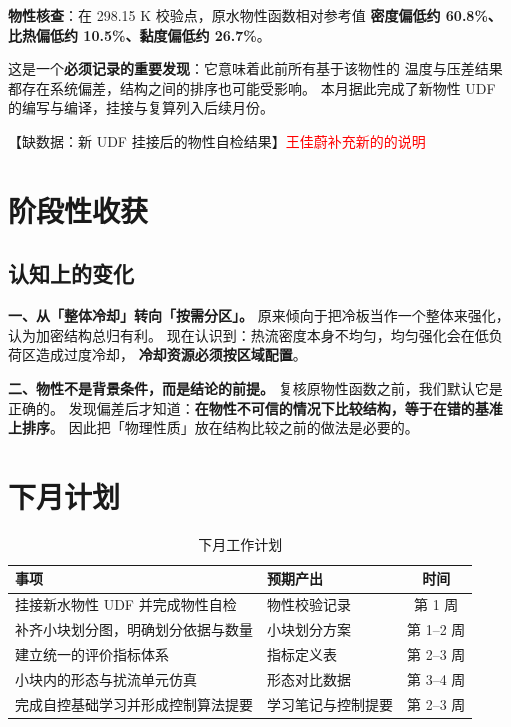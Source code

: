\documentclass[stage1,fontset=fandol]{ydzjreport}
\begin{document}
	
	
	\textbf{物性核查}：在 298.15 K 校验点，原水物性函数相对参考值
	\textbf{密度偏低约 60.8\%、比热偏低约 10.5\%、黏度偏低约 26.7\%}。
	
	这是一个\textbf{必须记录的重要发现}：它意味着此前所有基于该物性的
	温度与压差结果都存在系统偏差，结构之间的排序也可能受影响。
	本月据此完成了新物性 UDF 的编写与编译，挂接与复算列入后续月份。
	
	【缺数据：新 UDF 挂接后的物性自检结果】\textcolor{red}{王佳蔚补充新的的说明}
	
	\section{阶段性收获}
	
	\subsection{认知上的变化}
	
	\textbf{一、从「整体冷却」转向「按需分区」。}
	原来倾向于把冷板当作一个整体来强化，认为加密结构总归有利。
	现在认识到：热流密度本身不均匀，均匀强化会在低负荷区造成过度冷却，
	\textbf{冷却资源必须按区域配置}。
	
	\textbf{二、物性不是背景条件，而是结论的前提。}
	复核原物性函数之前，我们默认它是正确的。
	发现偏差后才知道：\textbf{在物性不可信的情况下比较结构，等于在错的基准上排序}。
	因此把「物理性质」放在结构比较之前的做法是必要的。
	
	
	
	\section{下月计划}
	
	\begin{table}[H]
		\centering
		\caption{下月工作计划}
		\label{tab:plan}
		\begin{tabularx}{\textwidth}{@{}Y Y c@{}}
			\toprule
			 事项 & 预期产出 & 时间 \\
			\midrule
			挂接新水物性 UDF 并完成物性自检 & 物性校验记录 & 第 1 周 \\
			补齐小块划分图，明确划分依据与数量 & 小块划分方案 & 第 1--2 周 \\
			建立统一的评价指标体系 & 指标定义表 & 第 2--3 周 \\
			小块内的形态与扰流单元仿真 & 形态对比数据 & 第 3--4 周 \\
			完成自控基础学习并形成控制算法提要 & 学习笔记与控制提要 & 第 2--3 周 \\
		\end{tabularx}
	\end{table}
	
\end{document}
